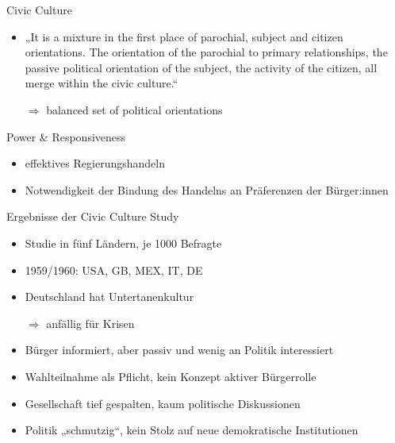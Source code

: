 \documentclass[11pt]{beamer}
\begin{document}
\begin{frame}[t]{Civic Culture}
	\begin{itemize}
		\item „It is a mixture in the first place of parochial, subject and citizen orientations. The orientation of the parochial to primary relationships, the passive political orientation of the subject, the activity of the citizen, all merge within the civic culture.“ \parencite[360]{Almond1980a} \pause
		\item[$\Rightarrow$] balanced set of political orientations
	\end{itemize}

\end{frame}


\begin{frame}[t]{Power \& Responsiveness}
	\begin{itemize}
		\item effektives Regierungshandeln \pause
	\end{itemize}
	
	\begin{itemize}
		\item Notwendigkeit der Bindung des Handelns an Präferenzen der Bürger:innen
	\end{itemize}
\end{frame}

\begin{frame}[t]{Ergebnisse der Civic Culture Study}
	\begin{itemize}
		\item Studie in fünf Ländern, je 1000 Befragte
		\item 1959/1960: USA, GB, MEX, IT, DE
		\item  Deutschland hat Untertanenkultur \pause
		\item[$\Rightarrow$] anfällig für Krisen \pause
		\item Bürger informiert, aber passiv und wenig an Politik interessiert
		\item Wahlteilnahme als Pflicht, kein Konzept aktiver Bürgerrolle
		\item Gesellschaft tief gespalten, kaum politische Diskussionen
		\item Politik „schmutzig“, kein Stolz auf neue demokratische Institutionen
	\end{itemize}

\end{frame}
\end{document}
